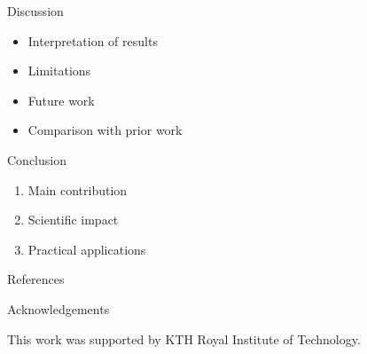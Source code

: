\documentclass[final]{beamer}
\newlength{\sepwidth}
\newlength{\colwidth}
\newcommand{\separatorcolumn}{
  \begin{column}{\sepwidth}
  \end{column}
}
\begin{document}
\begin{frame}[t]
\begin{columns}[t]
\begin{column}{\colwidth}
\begin{block}{Discussion}
\begin{itemize}
  \item Interpretation of results
  \item Limitations
  \item Future work
  \item Comparison with prior work
\end{itemize}

\end{block}

\begin{block}{Conclusion}

\begin{enumerate}
  \item Main contribution
  \item Scientific impact
  \item Practical applications
\end{enumerate}

\end{block}

\begin{block}{References}

{\footnotesize


}

\end{block}

\begin{block}{Acknowledgements}

This work was supported by KTH Royal Institute of Technology.

\end{block}

\end{column}

\separatorcolumn

\end{columns}

\end{frame}
\end{document}
